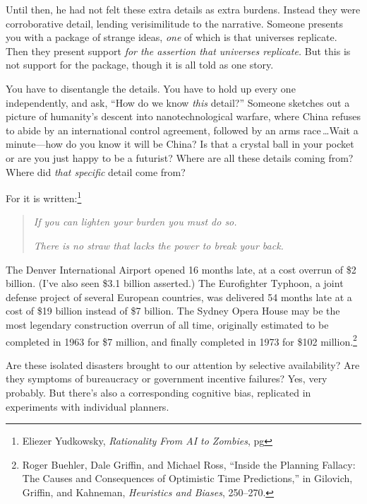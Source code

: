 {
 Until then, he had not felt these extra details as extra burdens.
Instead they were corroborative detail, lending verisimilitude to the
narrative. Someone presents you with a package of strange ideas,
\textit{one} of which is that universes replicate. Then they present
support \textit{for the assertion that universes replicate.} But this
is not support for the package, though it is all told as one story.}

{
 You have to disentangle the details. You have to hold up every one
independently, and ask, ``How do we know \textit{this}
detail?'' Someone sketches out a picture of
humanity's descent into nanotechnological warfare,
where China refuses to abide by an international control agreement,
followed by an arms race\,\ldots Wait a minute---how do you know it will
be China? Is that a crystal ball in your pocket or are you just happy
to be a futurist? Where are all these details coming from? Where did
\textit{that specific} detail come from?}

{
 For it is written:\footnote{Eliezer Yudkowsky, {\em Rationality From AI to Zombies}, pg \pageref{seventh_virtue}}}

\begin{quote}
{
 \textit{If you can lighten your burden you must do so.}}

{
 \textit{There is no straw that lacks the power to break your
   back.}}
\end{quote}

\myendsectiontext


\bigskip


{
 The Denver International Airport opened 16 months late, at a cost
overrun of \$2 billion. (I've also seen \$3.1 billion
asserted.) The Eurofighter Typhoon, a joint defense project of several
European countries, was delivered 54 months late at a cost of \$19
billion instead of \$7 billion. The Sydney Opera House may be the most
legendary construction overrun of all time, originally estimated to be
completed in 1963 for \$7 million, and finally completed in 1973 for
\$102 million.\footnote{Roger Buehler, Dale Griffin, and Michael Ross,
``Inside the Planning Fallacy: The Causes and
Consequences of Optimistic Time Predictions,'' in
Gilovich, Griffin, and Kahneman, \textit{Heuristics and Biases},
250--270.} }

{
 Are these isolated disasters brought to our attention by selective
availability? Are they symptoms of bureaucracy or government incentive
failures? Yes, very probably. But there's also a
corresponding cognitive bias, replicated in experiments with individual
planners.}

